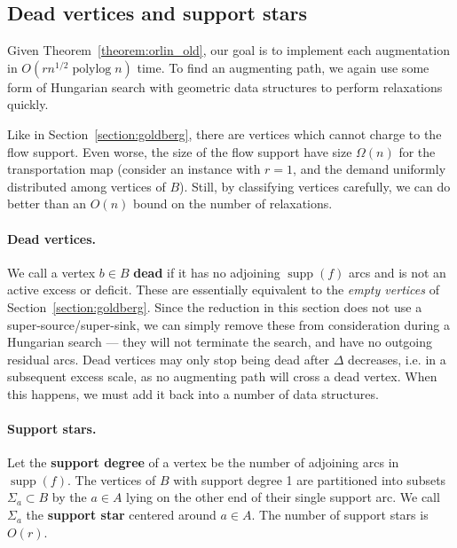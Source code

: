 \documentclass[11pt]{article}
\def\polylog{\mathop{\mathrm{polylog}}}
\def\supp{\operatorname{supp}}
\theoremstyle{plain}
\numberwithin{figure}{section}
\def\EMPH#1{\textbf{\boldmath #1}}
\begin{document}
\subsection{Dead vertices and support stars}

Given Theorem~\ref{theorem:orlin_old}, our goal is to implement each
augmentation in $O(rn^{1/2}\polylog n)$ time.
To find an augmenting path, we again use some form of Hungarian search with
geometric data structures to perform relaxations quickly.

Like in Section~\ref{section:goldberg}, there are vertices which cannot charge
to the flow support.
Even worse, the size of the flow support have size $\Omega(n)$ for the
transportation map (consider an instance with $r=1$, and the demand uniformly
distributed among vertices of $B$).
Still, by classifying vertices carefully, we can do better than an $O(n)$ bound
on the number of relaxations.

\paragraph{Dead vertices.}
We call a vertex $b \in B$ \EMPH{dead} if it has no adjoining
$\supp(f)$ arcs and is not an active excess or deficit.
These are essentially equivalent to the \emph{empty vertices} of
Section~\ref{section:goldberg}.
Since the reduction in this section does not use a super-source/super-sink,
we can simply remove these from consideration during a Hungarian search ---
they will not terminate the search, and have no outgoing residual arcs.
Dead vertices may only stop being dead after $\Delta$ decreases, i.e. in a
subsequent excess scale, as no augmenting path will cross a dead vertex.
When this happens, we must add it back into a number of data structures.

\paragraph{Support stars.}
Let the \EMPH{support degree} of a vertex be the number of adjoining arcs in
$\supp(f)$.
The vertices of $B$ with support degree 1 are partitioned into subsets
$\Sigma_a \subset B$ by the $a \in A$ lying on the other end of their single
support arc.
We call $\Sigma_a$ the \EMPH{support star} centered around $a \in A$.
The number of support stars is $O(r)$.
\end{document}
